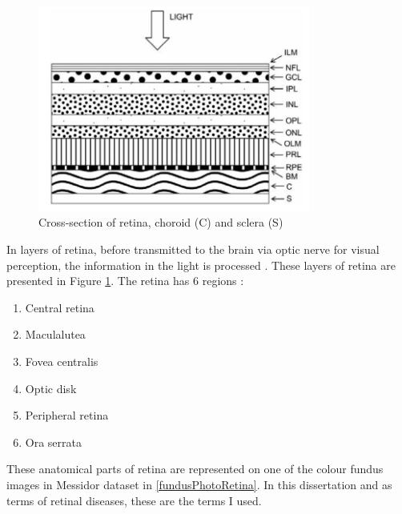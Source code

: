 \begin{figure}[t]
\centering
\includegraphics[width=0.8\textwidth]{Figures/layers_of_retina}
\caption{Cross-section of retina, choroid (C) and sclera (S) \citep{falt2012modern}}
\label{layersOfRetina}
\end{figure}


In layers of retina, before transmitted to the brain via optic nerve for visual perception, the information in the light is processed \citep{kauppi2010eye}. These layers of retina are presented in Figure \ref{layersOfRetina}. The retina has 6 regions \citep{forrester2015eye}:

\begin{enumerate}
    \item Central retina
    \item Maculalutea
    \item Fovea centralis
    \item Optic disk
    \item Peripheral retina
    \item Ora serrata
\end{enumerate}

These anatomical parts of retina are represented on one of the colour fundus images in Messidor dataset \citep{mookiah2015application} in \ref{fundusPhotoRetina}. In this dissertation and as terms of retinal diseases, these are the terms I used. 

